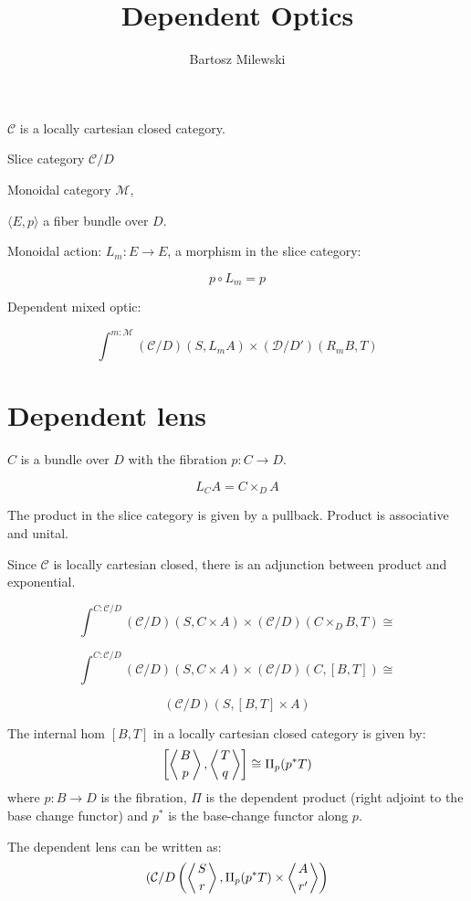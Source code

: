 \documentclass[11pt]{amsart}
\author{Bartosz Milewski}
\title{Dependent Optics}
\begin{document}
\maketitle{}

$\mathcal{C}$ is a locally cartesian closed category.

Slice category $\mathcal{C}/D$

Monoidal category $\mathcal{M}$, 

$\langle E, p \rangle$ a fiber bundle over $D$.

Monoidal action: $L_m \colon E \to E$, a morphism in the slice category:

\[p \circ L_m = p \]

Dependent mixed optic:

\[ \int^{m \colon \mathcal{M}} (\mathcal{C}/D)( S, L_m A) \times (\mathcal{D}/D')(R_m B, T) \]

\section{Dependent lens}

$C$ is a bundle over $D$ with the fibration $p \colon C \to D$.

\[ L_C A = C \times_D A \]

The product in the slice category is given by a pullback. Product is associative and unital. 

Since $\mathcal{C}$ is locally cartesian closed, there is an adjunction between product and exponential.

\[ \int^{C \colon \mathcal{C}/D} (\mathcal{C}/D)( S, C \times A) \times (\mathcal{C}/D)(C \times_D B, T) \cong \]

\[ \int^{C \colon \mathcal{C}/D} (\mathcal{C}/D)( S, C \times A) \times (\mathcal{C}/D)(C , [B, T]) \cong \]

\[  (\mathcal{C}/D)( S, [B, T] \times A) \]

The internal hom $[B, T]$ in a locally cartesian closed category is given by:
\[ \left [\left \langle B \atop p \right \rangle, \left \langle T \atop q \right \rangle \right ] \cong \Pi_p (p^* T)\]
where $p \colon B \to D$ is the fibration, $\Pi$ is the dependent product (right adjoint to the base change functor) and $p^*$ is the base-change functor along $p$.

The dependent lens can be written as:
\[ (\mathcal{C} / D \left( \left \langle S \atop r \right \rangle, \Pi_p (p^* T) \times \left \langle A \atop r' \right \rangle \right) \]
\end{document}
